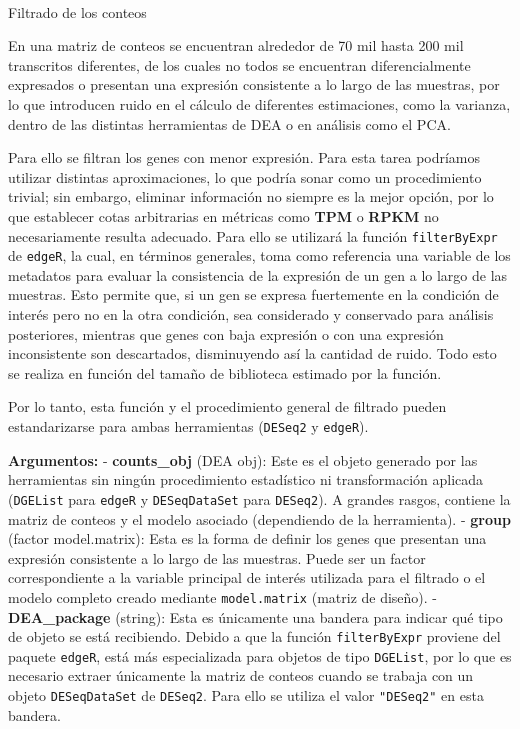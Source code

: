 \documentclass[
  10pt,
]{article}
\makeatletter
\let\oldparagraph\paragraph
\renewcommand{\paragraph}{
    \@ifstar
      \xxxParagraphStar
      \xxxParagraphNoStar
  }
\newcommand{\xxxParagraphStar}[1]{\oldparagraph*{#1}\mbox{}}
\newcommand{\xxxParagraphNoStar}[1]{\oldparagraph{#1}\mbox{}}
\makeatother
\begin{document}
\paragraph{Filtrado de los conteos}\label{filtrado-de-los-conteos}

En una matriz de conteos se encuentran alrededor de 70 mil hasta 200 mil
transcritos diferentes, de los cuales no todos se encuentran
diferencialmente expresados o presentan una expresión consistente a lo
largo de las muestras, por lo que introducen ruido en el cálculo de
diferentes estimaciones, como la varianza, dentro de las distintas
herramientas de DEA o en análisis como el PCA.

Para ello se filtran los genes con menor expresión. Para esta tarea
podríamos utilizar distintas aproximaciones, lo que podría sonar como un
procedimiento trivial; sin embargo, eliminar información no siempre es
la mejor opción, por lo que establecer cotas arbitrarias en métricas
como \textbf{TPM} o \textbf{RPKM} no necesariamente resulta adecuado.
Para ello se utilizará la función \texttt{filterByExpr} de
\texttt{edgeR}, la cual, en términos generales, toma como referencia una
variable de los metadatos para evaluar la consistencia de la expresión
de un gen a lo largo de las muestras. Esto permite que, si un gen se
expresa fuertemente en la condición de interés pero no en la otra
condición, sea considerado y conservado para análisis posteriores,
mientras que genes con baja expresión o con una expresión inconsistente
son descartados, disminuyendo así la cantidad de ruido. Todo esto se
realiza en función del tamaño de biblioteca estimado por la función.

Por lo tanto, esta función y el procedimiento general de filtrado pueden
estandarizarse para ambas herramientas (\texttt{DESeq2} y
\texttt{edgeR}).

\textbf{Argumentos:} - \textbf{counts\_obj} (DEA obj): Este es el objeto
generado por las herramientas sin ningún procedimiento estadístico ni
transformación aplicada (\texttt{DGEList} para \texttt{edgeR} y
\texttt{DESeqDataSet} para \texttt{DESeq2}). A grandes rasgos, contiene
la matriz de conteos y el modelo asociado (dependiendo de la
herramienta). - \textbf{group} (factor \textbar{} model.matrix): Esta es
la forma de definir los genes que presentan una expresión consistente a
lo largo de las muestras. Puede ser un factor correspondiente a la
variable principal de interés utilizada para el filtrado o el modelo
completo creado mediante \texttt{model.matrix} (matriz de diseño). -
\textbf{DEA\_package} (string): Esta es únicamente una bandera para
indicar qué tipo de objeto se está recibiendo. Debido a que la función
\texttt{filterByExpr} proviene del paquete \texttt{edgeR}, está más
especializada para objetos de tipo \texttt{DGEList}, por lo que es
necesario extraer únicamente la matriz de conteos cuando se trabaja con
un objeto \texttt{DESeqDataSet} de \texttt{DESeq2}. Para ello se utiliza
el valor \texttt{"DESeq2"} en esta bandera.
\end{document}
